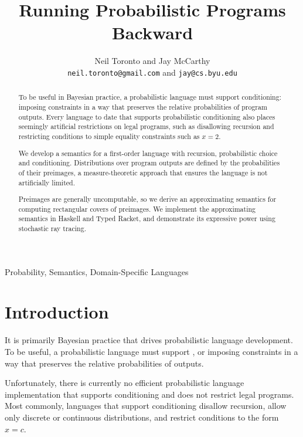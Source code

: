 \documentclass{llncs}
\title{Running Probabilistic Programs Backward}
\author{Neil Toronto and Jay McCarthy\\
\footnotesize{\texttt{neil.toronto@gmail.com} and \texttt{jay@cs.byu.edu}}}
\institute{PLT @ Brigham Young University, Provo, Utah, USA}
\date{}
\begin{document}
\maketitle

\begin{abstract}
To be useful in Bayesian practice, a probabilistic language must support conditioning: imposing constraints in a way that preserves the relative probabilities of program outputs.
Every language to date that supports probabilistic conditioning also places seemingly artificial restrictions on legal programs, such as disallowing recursion and restricting conditions to simple equality constraints such as $x = \mathrm{2}$.

We develop a semantics for a first-order language with recursion, probabilistic choice and conditioning.
Distributions over program outputs are defined by the probabilities of their preimages, a measure-theoretic approach that ensures the language is not artificially limited.

Preimages are generally uncomputable, so we derive an approximating semantics for computing rectangular covers of preimages.
We implement the approximating semantics in Haskell and Typed Racket, and demonstrate its expressive power using stochastic ray tracing.
\end{abstract}

\keywords Probability, Semantics, Domain-Specific Languages


\section{Introduction}

It is primarily Bayesian practice that drives probabilistic language development.
To be useful, a probabilistic language must support , or imposing constraints in a way that preserves the relative probabilities of outputs.

Unfortunately, there is currently no efficient probabilistic language implementation that supports conditioning and does not restrict legal programs.
Most commonly, languages that support conditioning disallow recursion, allow only discrete or continuous distributions, and restrict conditions to the form $\mathit{x} = \mathit{c}$.
\end{document}
